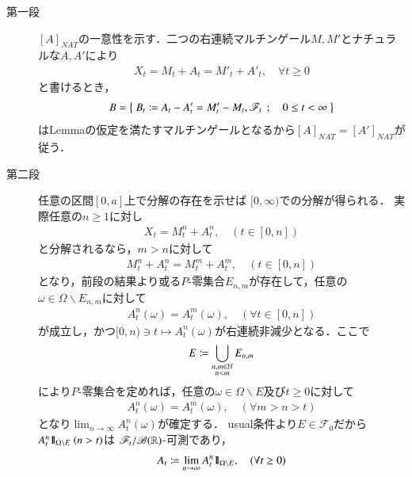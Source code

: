 	\begin{prf}[未修正] \mbox{}
		\begin{description}
			\item[第一段]
				$[A]_{NAT}$の一意性を示す．二つの右連続マルチンゲール$M,M'$とナチュラルな$A,A'$により
				\begin{align}
					X_t = M_t + A_t = M'_t + A'_t,
					\quad \forall t \geq 0
				\end{align}
				と書けるとき，
				\begin{align}
					B=\left\{\ B_t \coloneqq A_t - A'_t = M'_t - M_t,\mathscr{F}_t\ \, ; \quad 0 \leq t < \infty\ \right\}
				\end{align}
				はLemmaの仮定を満たすマルチンゲールとなるから$[A]_{NAT} = [A']_{NAT}$が従う．
				
			\item[第二段]
				任意の区間$[0,a]$上で分解の存在を示せば
				$[0,\infty)$での分解が得られる．
				実際任意の$n \geq 1$に対し
				\begin{align}
					X_t = M^n_t + A^n_t, \quad (t \in [0,n])
				\end{align}
				と分解されるなら，$m > n$に対して
				\begin{align}
					M^n_t + A^n_t = M^m_t + A^m_t, \quad (t \in [0,n])
				\end{align}
				となり，前段の結果より或る$P$-零集合$E_{n,m}$が存在して，任意の$\omega \in \Omega \backslash E_{n,m}$に対して
				\begin{align}
					A^n_t(\omega) = A^m_t(\omega), \quad (\forall t \in [0,n])
				\end{align}
				が成立し，かつ$[0,n) \ni t \longmapsto A^n_t(\omega)$が右連続非減少となる．ここで
				\begin{align}
					E \coloneqq \bigcup_{\substack{n,m \in \mathbb{N} \\ n<m}} E_{n,m}
				\end{align}
				により$P$-零集合を定めれば，任意の$\omega \in \Omega \backslash E$及び$t \geq 0$に対して
				\begin{align}
					A^n_t(\omega) = A^m_t(\omega), \quad (\forall m > n > t)
				\end{align}
				となり$\lim_{n \to \infty} A^n_t(\omega)$が確定する．
				usual条件より$E \in \mathscr{F}_0$だから$A^n_t \mbox{1}\hspace{-0.25em}\mbox{l}_{\Omega \backslash E}\ (n > t)$は
				$\mathscr{F}_t/\mathscr{B}(\mathbb{R})$-可測であり，
				\begin{align}
					A_t \coloneqq  \lim_{n \to \infty} A^n_t \mbox{1}\hspace{-0.25em}\mbox{l}_{\Omega \backslash E},
					\quad (\forall t \geq 0)
				\end{align}

\end{description}
\end{prf}
